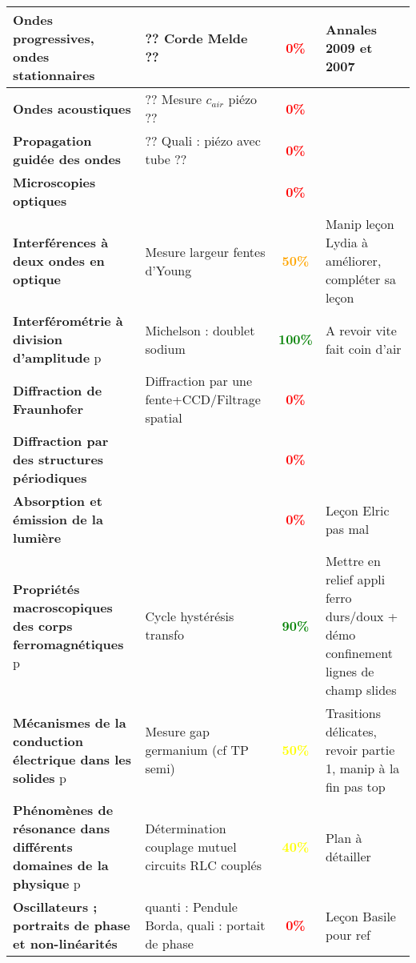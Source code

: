 \begin{changemargin}{-1.5cm}{-0cm}
\begin{center}
\begin{tabularx}{\paperwidth-2cm}{| X | X | c | X |}
\hline
  \textbf{Ondes progressives, ondes stationnaires} & ?? Corde Melde ?? & \textcolor{red}{\textbf{0\%}} & Annales 2009 et 2007 \\
  \hline
  \textbf{Ondes acoustiques} & ?? Mesure $c_{air}$ piézo ?? & \textcolor{red}{\textbf{0\%}} &  \\
  \hline
  \textbf{Propagation guidée des ondes} & ?? Quali : piézo avec tube  ?? & \textcolor{red}{\textbf{0\%}} & \\
  \hline
  \textbf{Microscopies optiques} & & \textcolor{red}{\textbf{0\%}} &  \\
  \hline
  \textbf{Interférences à deux ondes en optique} & Mesure largeur fentes d'Young & \textcolor{orange}{\textbf{50\%}} & Manip leçon Lydia à améliorer, compléter sa leçon \\
  \hline
  \textbf{Interférométrie à division d'amplitude} p\pageref{LP_DivisionAmplitude} & Michelson : doublet sodium & \textcolor{green}{\textbf{100\%}} & A revoir vite fait coin d'air \\
  \hline
  \textbf{Diffraction de Fraunhofer} & Diffraction par une fente+CCD/Filtrage spatial & \textcolor{red}{\textbf{0\%}} &  \\
  \hline
  \textbf{Diffraction par des structures périodiques} &  & \textcolor{red}{\textbf{0\%}} &  \\
  \hline
  \textbf{Absorption et émission de la lumière} &  & \textcolor{red}{\textbf{0\%}} & Leçon Elric pas mal \\
  \hline
  \hline
  \textbf{Propriétés macroscopiques des corps ferromagnétiques } p\pageref{LP_Ferromagnetisme} & Cycle hystérésis transfo & \textcolor{green}{\textbf{90\%}} & Mettre en relief appli ferro durs/doux + démo confinement lignes de champ slides \\
  \hline
  \textbf{Mécanismes de la conduction électrique dans les solides} p\pageref{LP_Conduction} & Mesure gap germanium (cf TP semi) & \textcolor{yellow}{\textbf{50\%}} & Trasitions délicates, revoir partie 1, manip à la fin pas top \\
  \hline
  \textbf{Phénomènes de résonance dans différents domaines de la physique} p\pageref{LP_resonance} & Détermination couplage mutuel circuits RLC couplés & \textcolor{yellow}{\textbf{40\%}} & Plan à détailler  \\
  \hline
  \textbf{Oscillateurs ; portraits de phase et non-linéarités} & quanti : Pendule Borda, quali : portait de phase & \textcolor{red}{\textbf{0\%}} & Leçon Basile pour ref  \\

\end{tabularx}
\end{center}
\end{changemargin}
